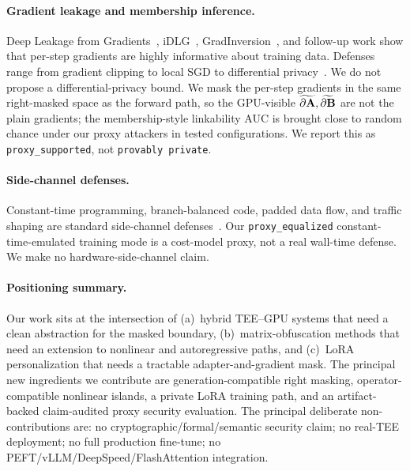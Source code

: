 \paragraph{Gradient leakage and membership inference.}
Deep Leakage from Gradients~\cite{zhu2019dlg}, iDLG~\cite{zhao2020idlg}, GradInversion~\cite{yin2021gradinversion}, and follow-up work show that per-step gradients are highly informative about training data. Defenses range from gradient clipping to local SGD to differential privacy~\cite{abadi2016dpsgd}. We do not propose a differential-privacy bound. We mask the per-step gradients in the same right-masked space as the forward path, so the GPU-visible $\widetilde{\partial\mathbf{A}}, \widetilde{\partial\mathbf{B}}$ are not the plain gradients; the membership-style linkability AUC is brought close to random chance under our proxy attackers in tested configurations. We report this as \texttt{proxy\_supported}, not \texttt{provably private}.

\paragraph{Side-channel defenses.}
Constant-time programming, branch-balanced code, padded data flow, and traffic shaping are standard side-channel defenses~\cite{kocher2019spectre, vanbulck2018foreshadow}. Our \texttt{proxy\_equalized} constant-time-emulated training mode is a cost-model proxy, not a real wall-time defense. We make no hardware-side-channel claim.

\paragraph{Positioning summary.}
Our work sits at the intersection of (a)~hybrid TEE--GPU systems that need a clean abstraction for the masked boundary, (b)~matrix-obfuscation methods that need an extension to nonlinear and autoregressive paths, and (c)~LoRA personalization that needs a tractable adapter-and-gradient mask. The principal new ingredients we contribute are generation-compatible right masking, operator-compatible nonlinear islands, a private LoRA training path, and an artifact-backed claim-audited proxy security evaluation. The principal deliberate non-contributions are: no cryptographic/formal/semantic security claim; no real-TEE deployment; no full production fine-tune; no PEFT/vLLM/DeepSpeed/FlashAttention integration.
